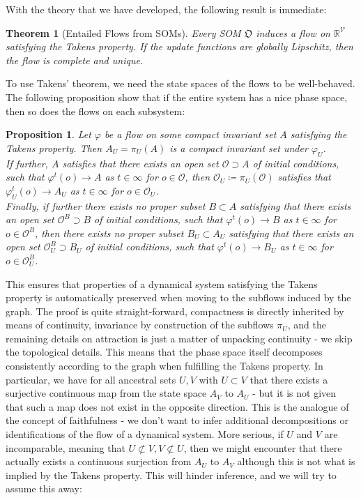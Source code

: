 \documentclass[11pt, a4paper]{memoir}
\theoremstyle{break}
\newtheorem{thm}{Theorem}
\newtheorem{prop}{Proposition}
\theoremstyle{break}
\theoremstyle{nonumberplain}
\newcommand{\mR}{\mathbb{R}}
\begin{document}
With the theory that we have developed, the following result is immediate:
\begin{thm}[Entailed Flows from SOMs]
Every SOM $\mathfrak{O}$ induces a flow on $\mR^{\mathcal{V}}$ satisfying the Takens property. If the update functions are globally Lipschitz, then the flow is complete and unique.
\end{thm}
To use Takens' theorem, we need the state spaces of the flows to be well-behaved. The following proposition show that if the entire system has a nice phase space, then so does the flows on each subsystem:
\begin{prop}
Let $\varphi$ be a flow on some compact invariant set $A$ satisfying the Takens property. Then $A_U=\pi_U(A)$ is a compact invariant set under $\varphi_U$.\\[5pt]
If further, $A$ satisfies that there exists an open set $\mathcal{O}\supset A$ of initial conditions, such that $\varphi^t(o)\to A$ as $t\in \infty$ for $o\in \mathcal{O}$, then $\mathcal{O}_U\coloneqq \pi_U(\mathcal{O})$ satisfies that $\varphi^t_U(o)\to A_U$ as $t\in \infty$ for $o\in \mathcal{O}_U$.\\[5pt]
Finally, if further there exists no proper subset $B\subset A$ satisfying that there exists an open set $\mathcal{O}^B\supset B$ of initial conditions, such that $\varphi^t(o)\to B$ as $t\in \infty$ for $o\in \mathcal{O}^B$, then there exists no proper subset $B_U\subset A_U$ satisfying that there exists an open set $\mathcal{O}_U^B\supset B_U$ of initial conditions, such that $\varphi^t(o)\to B_U$ as $t\in \infty$ for $o\in \mathcal{O}^B_U$.
\end{prop}
This ensures that properties of a dynamical system satisfying the Takens property is automatically preserved when moving to the subflows induced by the graph. The proof is quite straight-forward, compactness is directly inherited by means of continuity, invariance by construction of the subflows $\pi_U$, and the remaining details on attraction is just a matter of unpacking continuity - we skip the topological details. This means that the phase space itself decomposes consistently according to the graph when fulfilling the Takens property. In particular, we have for all ancestral sets $U,V$ with $U\subset V$ that there exists a surjective continuous map from the state space $A_V$ to $A_U$ - but it is not given that such a map does not exist in the opposite direction. This is the analogue of the concept of faithfulness - we don't want to infer additional decompositions or identifications of the flow of a dynamical system. More serious, if $U$ and $V$ are incomparable, meaning that $U\not\subset V, V\not\subset U$, then we might encounter that there actually exists a continuous surjection from $A_U$ to $A_V$ although this is not what is implied by the Takens property. This will hinder inference, and we will try to assume this away:
\end{document}
